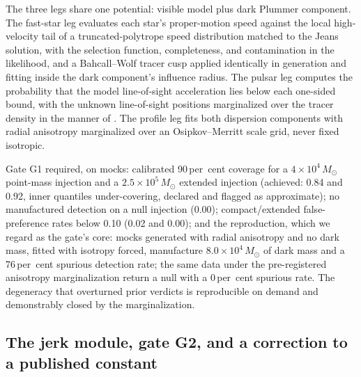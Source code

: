\documentclass[11pt]{article}
\newcommand{\msun}{\ensuremath{M_\odot}}
\begin{document}
The three legs share one potential: visible model plus dark Plummer component. The fast-star leg evaluates each star's proper-motion speed against the local high-velocity tail of a truncated-polytrope speed distribution matched to the Jeans solution, with the selection function, completeness, and contamination in the likelihood, and a Bahcall--Wolf tracer cusp \citep{BahcallWolf1976} applied identically in generation and fitting inside the dark component's influence radius. The pulsar leg computes the probability that the model line-of-sight acceleration lies below each one-sided bound, with the unknown line-of-sight positions marginalized over the tracer density in the manner of \citet{Prager2017}. The profile leg fits both dispersion components with radial anisotropy marginalized over an Osipkov--Merritt scale grid, never fixed isotropic.

Gate G1 required, on mocks: calibrated 90\,per~cent coverage for a $4\times10^{4}\,\msun$ point-mass injection and a $2.5\times10^{5}\,\msun$ extended injection (achieved: 0.84 and 0.92, inner quantiles under-covering, declared and flagged as approximate); no manufactured detection on a null injection (0.00); compact/extended false-preference rates below 0.10 (0.02 and 0.00); and the \citet{Aros2020} reproduction, which we regard as the gate's core: mocks generated with radial anisotropy and no dark mass, fitted with isotropy forced, manufacture $8.0\times10^{4}\,\msun$ of dark mass and a 76\,per~cent spurious detection rate; the same data under the pre-registered anisotropy marginalization return a null with a 0\,per~cent spurious rate. The degeneracy that overturned prior verdicts is reproducible on demand and demonstrably closed by the marginalization.

\subsection{The jerk module, gate G2, and a correction to a published constant}
\label{sec:jerk}
\end{document}
